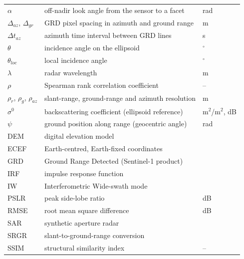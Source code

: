 \begin{longtable}{@{}p{30mm} p{90mm} l@{}}
$\alpha$ & off-nadir look angle from the sensor to a facet & rad \\
$\Delta_{az}$, $\Delta_{gr}$ & GRD pixel spacing in azimuth and ground range & m \\
$\Delta t_{az}$ & azimuth time interval between GRD lines & s \\
$\theta$ & incidence angle on the ellipsoid & $^\circ$ \\
$\theta_{loc}$ & local incidence angle & $^\circ$ \\
$\lambda$ & radar wavelength & m \\
$\rho$ & Spearman rank correlation coefficient & -- \\
$\rho_r$, $\rho_g$, $\rho_{az}$ & slant-range, ground-range and azimuth resolution & m \\
$\sigma^0$ & backscattering coefficient (ellipsoid reference) & m$^2$/m$^2$, dB \\
$\psi$ & ground position along range (geocentric angle) & rad \\
\midrule
DEM & digital elevation model & \\
ECEF & Earth-centred, Earth-fixed coordinates & \\
GRD & Ground Range Detected (Sentinel-1 product) & \\
IRF & impulse response function & \\
IW & Interferometric Wide-swath mode & \\
PSLR & peak side-lobe ratio & dB \\
RMSE & root mean square difference & dB \\
SAR & synthetic aperture radar & \\
SRGR & slant-to-ground-range conversion & \\
SSIM & structural similarity index & -- \\
\bottomrule
\end{longtable}
\cleardoublepage

